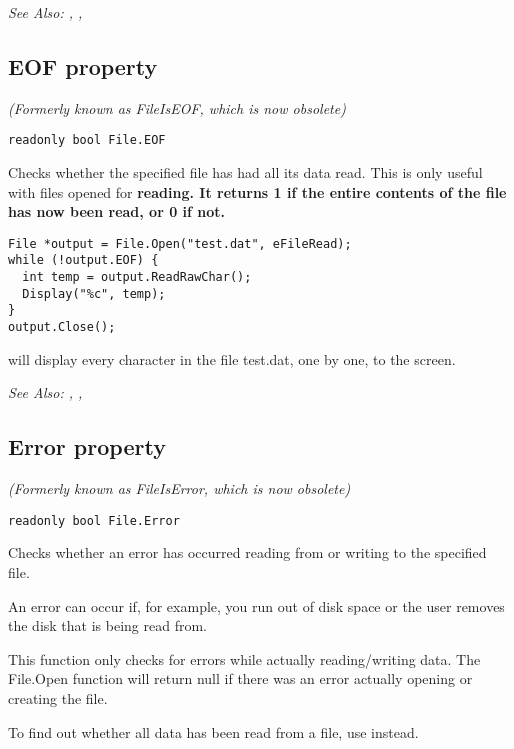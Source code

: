 \it{See Also:} , ,


\subsection{EOF property}\label{File.EOF}%

\it{(Formerly known as FileIsEOF, which is now obsolete)}

\begin{verbatim}
readonly bool File.EOF
\end{verbatim}
Checks whether the specified file has had all its data read. This is only useful
with files opened for \bf{reading}. It returns 1 if the entire contents of the file
has now been read, or 0 if not.

\begin{verbatim}
File *output = File.Open("test.dat", eFileRead);
while (!output.EOF) {
  int temp = output.ReadRawChar();
  Display("%c", temp);
}
output.Close();
\end{verbatim}
will display every character in the file test.dat, one by one, to the screen.

\it{See Also:} , ,


\subsection{Error property}\label{File.Error}%

\it{(Formerly known as FileIsError, which is now obsolete)}

\begin{verbatim}
readonly bool File.Error
\end{verbatim}
Checks whether an error has occurred reading from or writing to the specified file.

An error can occur if, for example, you run out of disk space or the user removes the
disk that is being read from.

This function only checks for errors while actually reading/writing data. The File.Open
function will return null if there was an error actually opening or creating the file.

To find out whether all data has been read from a file, use  instead.

